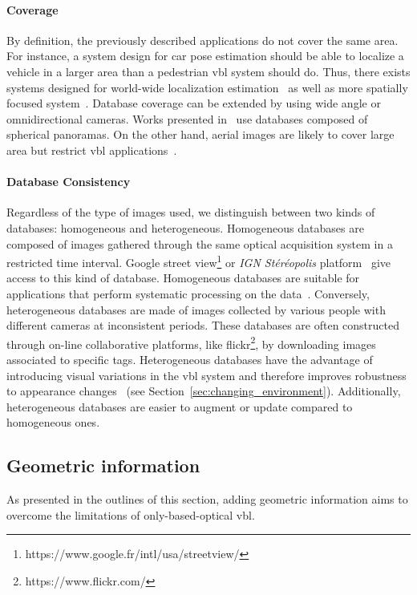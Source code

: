 		\paragraph{Coverage}			
			By definition, the previously described applications do not cover the same area. For instance, a system design for car pose estimation should be able to localize a vehicle in a larger area than a pedestrian \ac{vbl} system should do. Thus, there exists systems designed for world-wide localization estimation~\citep{Hays2008,Weyand2016,Vo2017} as well as more spatially focused system~\citep{Song2016}. Database coverage can be extended by using wide angle or omnidirectional cameras. Works presented in~\citep{Arandjelovic2016,Iscen2017,Kumar2016mastersThesis,Ramalingam2010,Torii2011,Zamir2010,Zamir2014} use databases composed of spherical panoramas. On the other hand, aerial images are likely to cover large area but restrict \ac{vbl} applications~\citep{Wan2016}.
			
		\paragraph{Database Consistency}
			\label{para:data_consistency}
			Regardless of the type of images used, we distinguish between two kinds of databases: homogeneous and heterogeneous. Homogeneous databases are composed of images gathered through the same optical acquisition system in a restricted time interval. Google street view\footnote{https://www.google.fr/intl/usa/streetview/} or \textit{IGN St\'er\'eopolis} platform~\citep{Paparoditis2012} give access to this kind of database. Homogeneous databases are suitable for applications that perform systematic processing on the data~\citep{Majdik2013,Torii2015}. Conversely, heterogeneous databases are made of images collected by various people with different cameras at inconsistent periods. These databases are often constructed through on-line collaborative platforms, like flickr\footnote{https://www.flickr.com/}, by downloading images associated to specific tags. Heterogeneous databases have the advantage of introducing visual variations in the \ac{vbl} system and therefore improves robustness to appearance changes~\citep{Radenovic2016,Gordo2016} (see Section~\ref{sec:changing_environment}). Additionally, heterogeneous databases are easier to augment or update compared to homogeneous ones.
			
	\subsection{Geometric information}
		\label{subsec:geometric_info}
		As presented in the outlines of this section, adding geometric information aims to overcome the limitations of only-based-optical \ac{vbl}.
        

